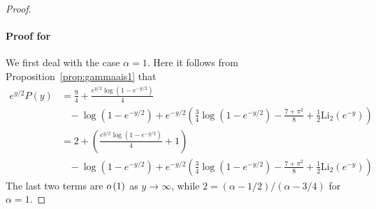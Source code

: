 \begin{proof}
\paragraph{Proof for }
We first deal with the case $\alpha = 1$. Here it follows from Proposition~\ref{prop:gammaais1} that
\begin{align*}
	e^{y/2}P(y) &= \frac{9}{4} + \frac{e^{y/2}\log(1-e^{-y/2})}{4} \\
	&\hspace{10pt}-\log(1-e^{-y/2}) + e^{-y/2}\left(\frac{3}{4}\log(1-e^{-y/2}) - \frac{7 + \pi^2}{8} + 	
		\frac{1}{2}\mathrm{Li}_2(e^{-y})\right) \\
	&= 2 + \left(\frac{e^{y/2}\log(1-e^{-y/2})}{4} + 1\right)\\
	&\hspace{10pt}-\log(1-e^{-y/2}) + e^{-y/2}\left(\frac{3}{4}\log(1-e^{-y/2}) - \frac{7 + \pi^2}{8} + 	
		\frac{1}{2}\mathrm{Li}_2(e^{-y})\right)
\end{align*}
The last two terms are $o\left(1\right)$ as $y \to \infty$, while $2 = (\alpha - 1/2)/(\alpha - 3/4)$ for $\alpha = 1$.


\end{proof}
